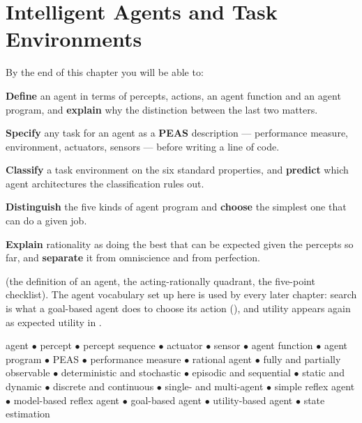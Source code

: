 \chapter{Intelligent Agents and Task Environments}\label{ch:agents}

\begin{outcomes}
By the end of this chapter you will be able to:
\begin{tight}
  \item \textbf{Define} an agent in terms of percepts, actions, an agent function
        and an agent program, and \textbf{explain} why the distinction between the
        last two matters.
  \item \textbf{Specify} any task for an agent as a \textbf{PEAS} description ---
        performance measure, environment, actuators, sensors --- before writing a
        line of code.
  \item \textbf{Classify} a task environment on the six standard properties, and
        \textbf{predict} which agent architectures the classification rules out.
  \item \textbf{Distinguish} the five kinds of agent program and \textbf{choose}
        the simplest one that can do a given job.
  \item \textbf{Explain} rationality as doing the best that can be expected given
        the percepts so far, and \textbf{separate} it from omniscience and from
        perfection.
\end{tight}
\end{outcomes}

\begin{prereq}
 (the definition of an agent, the acting-rationally quadrant,
the five-point checklist). The agent vocabulary set up here is used by every later
chapter: search is what a goal-based agent does to choose its action
(), and utility appears again as expected utility in
.
\end{prereq}

\begin{keyterms}
agent $\bullet$ percept $\bullet$ percept sequence $\bullet$ actuator $\bullet$
sensor $\bullet$ agent function $\bullet$ agent program $\bullet$ PEAS $\bullet$
performance measure $\bullet$ rational agent $\bullet$ fully and partially
observable $\bullet$ deterministic and stochastic $\bullet$ episodic and
sequential $\bullet$ static and dynamic $\bullet$ discrete and continuous
$\bullet$ single- and multi-agent $\bullet$ simple reflex agent $\bullet$
model-based reflex agent $\bullet$ goal-based agent $\bullet$ utility-based agent
$\bullet$ state estimation
\end{keyterms}

